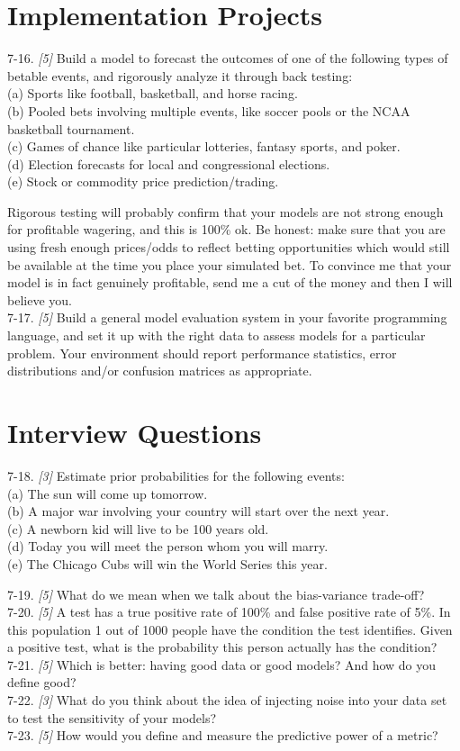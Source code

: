 \documentclass[10pt]{article}
\begin{document}
\section*{Implementation Projects}
7-16. \textit{[5]} Build a model to forecast the outcomes of one of the following types of betable events, and rigorously analyze it through back testing:\\
(a) Sports like football, basketball, and horse racing.\\
(b) Pooled bets involving multiple events, like soccer pools or the NCAA basketball tournament.\\
(c) Games of chance like particular lotteries, fantasy sports, and poker.\\
(d) Election forecasts for local and congressional elections.\\
(e) Stock or commodity price prediction/trading.

Rigorous testing will probably confirm that your models are not strong enough for profitable wagering, and this is 100\% ok. Be honest: make sure that you are using fresh enough prices/odds to reflect betting opportunities which would still be available at the time you place your simulated bet. To convince me that your model is in fact genuinely profitable, send me a cut of the money and then I will believe you.\\[0pt]
7-17. \textit{[5]} Build a general model evaluation system in your favorite programming language, and set it up with the right data to assess models for a particular problem. Your environment should report performance statistics, error distributions and/or confusion matrices as appropriate.

\section*{Interview Questions}
7-18. \textit{[3]} Estimate prior probabilities for the following events:\\
(a) The sun will come up tomorrow.\\
(b) A major war involving your country will start over the next year.\\
(c) A newborn kid will live to be 100 years old.\\
(d) Today you will meet the person whom you will marry.\\
(e) The Chicago Cubs will win the World Series this year.

7-19. \textit{[5]} What do we mean when we talk about the bias-variance trade-off?\\
7-20. \textit{[5]} A test has a true positive rate of 100\% and false positive rate of 5\%. In this population 1 out of 1000 people have the condition the test identifies. Given a positive test, what is the probability this person actually has the condition?\\[0pt]
7-21. \textit{[5]} Which is better: having good data or good models? And how do you define good?\\[0pt]
7-22. \textit{[3]} What do you think about the idea of injecting noise into your data set to test the sensitivity of your models?\\[0pt]
7-23. \textit{[5]} How would you define and measure the predictive power of a metric?
\end{document}
